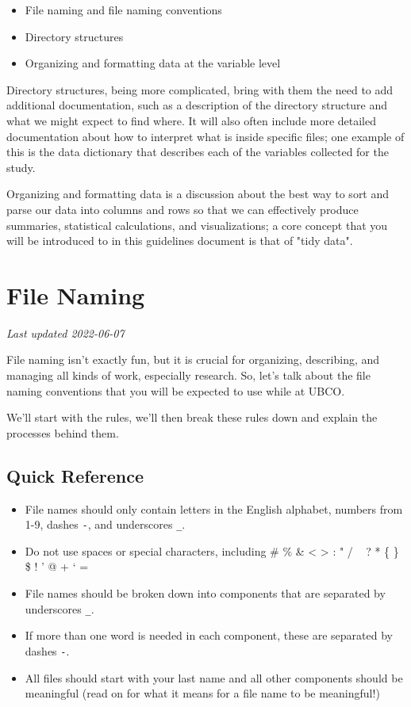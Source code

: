 \documentclass[
]{book}
\providecommand{\tightlist}{%
  \setlength{\itemsep}{0pt}\setlength{\parskip}{0pt}}
\begin{document}
\begin{itemize}
\tightlist
\item
  File naming and file naming conventions
\item
  Directory structures
\item
  Organizing and formatting data at the variable level
\end{itemize}

Directory structures, being more complicated, bring with them the need to add additional documentation, such as a description of the directory structure and what we might expect to find where. It will also often include more detailed documentation about how to interpret what is inside specific files; one example of this is the data dictionary that describes each of the variables collected for the study.

Organizing and formatting data is a discussion about the best way to sort and parse our data into columns and rows so that we can effectively produce summaries, statistical calculations, and visualizations; a core concept that you will be introduced to in this guidelines document is that of "tidy data".

\hypertarget{file-naming}{%
\chapter{File Naming}\label{file-naming}}

\emph{Last updated 2022-06-07}

File naming isn't exactly fun, but it is crucial for organizing, describing, and managing all kinds of work, especially research. So, let's talk about the file naming conventions that you will be expected to use while at UBCO.

We'll start with the rules, we'll then break these rules down and explain the processes behind them.

\hypertarget{quick-reference}{%
\section{Quick Reference}\label{quick-reference}}

\begin{itemize}
\tightlist
\item
  File names should only contain letters in the English alphabet, numbers from 1-9, dashes \texttt{-}, and underscores \texttt{\_}.
\item
  Do not use spaces or special characters, including \# \% \& \textless{} \textgreater{} : " / ~\textbar{} ? * \{ \} \$ ! ' @ + ` =
\item
  File names should be broken down into components that are separated by underscores \texttt{\_}.
\item
  If more than one word is needed in each component, these are separated by dashes \texttt{-}.
\item
  All files should start with your last name and all other components should be meaningful (read on for what it means for a file name to be meaningful!)
\end{itemize}
\end{document}
